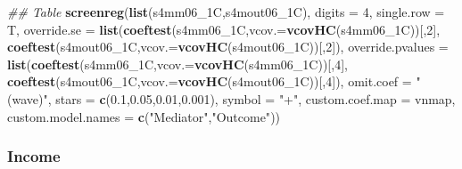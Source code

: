 \documentclass[
]{article}
\newenvironment{Shaded}{\begin{snugshade}}{\end{snugshade}}
\newcommand{\CommentTok}[1]{\textcolor[rgb]{0.56,0.35,0.01}{\textit{#1}}}
\newcommand{\DataTypeTok}[1]{\textcolor[rgb]{0.13,0.29,0.53}{#1}}
\newcommand{\DecValTok}[1]{\textcolor[rgb]{0.00,0.00,0.81}{#1}}
\newcommand{\FloatTok}[1]{\textcolor[rgb]{0.00,0.00,0.81}{#1}}
\newcommand{\KeywordTok}[1]{\textcolor[rgb]{0.13,0.29,0.53}{\textbf{#1}}}
\newcommand{\NormalTok}[1]{#1}
\newcommand{\StringTok}[1]{\textcolor[rgb]{0.31,0.60,0.02}{#1}}
\begin{document}
\begin{Shaded}
\begin{Highlighting}[]
\CommentTok{## Table}
\KeywordTok{screenreg}\NormalTok{(}\KeywordTok{list}\NormalTok{(s4mm06_1C,s4mout06_1C), }\DataTypeTok{digits =} \DecValTok{4}\NormalTok{, }\DataTypeTok{single.row =}\NormalTok{ T,}
          \DataTypeTok{override.se =} \KeywordTok{list}\NormalTok{(}\KeywordTok{coeftest}\NormalTok{(s4mm06_1C,}\DataTypeTok{vcov.=}\KeywordTok{vcovHC}\NormalTok{(s4mm06_1C))[,}\DecValTok{2}\NormalTok{],}
                             \KeywordTok{coeftest}\NormalTok{(s4mout06_1C,}\DataTypeTok{vcov.=}\KeywordTok{vcovHC}\NormalTok{(s4mout06_1C))[,}\DecValTok{2}\NormalTok{]),}
          \DataTypeTok{override.pvalues =} \KeywordTok{list}\NormalTok{(}\KeywordTok{coeftest}\NormalTok{(s4mm06_1C,}\DataTypeTok{vcov.=}\KeywordTok{vcovHC}\NormalTok{(s4mm06_1C))[,}\DecValTok{4}\NormalTok{],}
                                  \KeywordTok{coeftest}\NormalTok{(s4mout06_1C,}\DataTypeTok{vcov.=}\KeywordTok{vcovHC}\NormalTok{(s4mout06_1C))[,}\DecValTok{4}\NormalTok{]),}
          \DataTypeTok{omit.coef =} \StringTok{"(wave)"}\NormalTok{, }\DataTypeTok{stars =} \KeywordTok{c}\NormalTok{(}\FloatTok{0.1}\NormalTok{,}\FloatTok{0.05}\NormalTok{,}\FloatTok{0.01}\NormalTok{,}\FloatTok{0.001}\NormalTok{), }\DataTypeTok{symbol =} \StringTok{"+"}\NormalTok{,}
          \DataTypeTok{custom.coef.map =}\NormalTok{ vnmap, }
          \DataTypeTok{custom.model.names =} \KeywordTok{c}\NormalTok{(}\StringTok{"Mediator"}\NormalTok{,}\StringTok{"Outcome"}\NormalTok{))}
\end{Highlighting}
\end{Shaded}

\hypertarget{income}{%
\subsubsection{Income}\label{income}}
\end{document}
